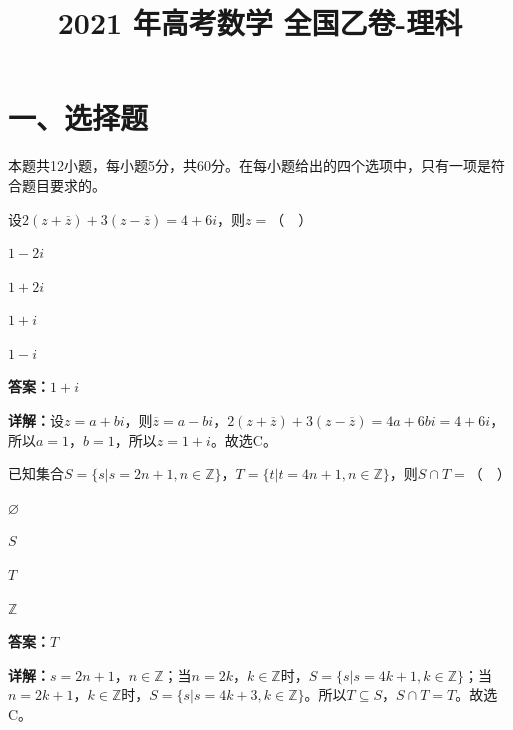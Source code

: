 ﻿\title{2021 年高考数学 全国乙卷-理科}
\date{}
\maketitle

\section*{一、选择题}
本题共12小题，每小题5分，共60分。在每小题给出的四个选项中，只有一项是符合题目要求的。

\begin{question}[points=5]
设$2(z+\overline{z})+3(z-\overline{z})=4+6i$，则$z=$（  ）
\begin{choices}
  \item $1-2i$
  \item $1+2i$
  \item $1+i$
  \item $1-i$
\end{choices}
\begin{solution}
\textbf{答案：}$1+i$

\textbf{详解：}设$z=a+bi$，则$\overline{z}=a-bi$，$2(z+\overline{z})+3(z-\overline{z})=4a+6bi=4+6i$，所以$a=1$，$b=1$，所以$z=1+i$。故选C。
\end{solution}
\end{question}

\begin{question}[points=5]
已知集合$S=\{s|s=2n+1,n\in\mathbb{Z}\}$，$T=\{t|t=4n+1,n\in\mathbb{Z}\}$，则$S\cap T=$（  ）
\begin{choices}
  \item $\varnothing$
  \item $S$
  \item $T$
  \item $\mathbb{Z}$
\end{choices}
\begin{solution}
\textbf{答案：}$T$

\textbf{详解：}$s=2n+1$，$n\in\mathbb{Z}$；当$n=2k$，$k\in\mathbb{Z}$时，$S=\{s|s=4k+1,k\in\mathbb{Z}\}$；当$n=2k+1$，$k\in\mathbb{Z}$时，$S=\{s|s=4k+3,k\in\mathbb{Z}\}$。所以$T\subseteq S$，$S\cap T=T$。故选C。
\end{solution}
\end{question}

